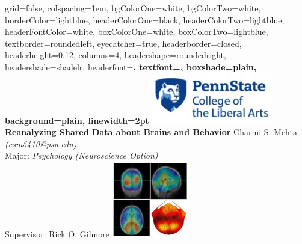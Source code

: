 \documentclass[landscape,final,paperwidth=48in,paperheight=48in,fontscale=0.285]{baposter}
\begin{document}



\begin{poster}%
  {
  grid=false,
  colspacing=1em,
  bgColorOne=white,
  bgColorTwo=white,
  borderColor=lightblue,
  headerColorOne=black,
  headerColorTwo=lightblue,
  headerFontColor=white,
  boxColorOne=white,
  boxColorTwo=lightblue,
  textborder=roundedleft,
  eyecatcher=true,
  headerborder=closed,
  headerheight=0.12\textheight,
  columns=4, %
  headershape=roundedright,
  headershade=shadelr,
  headerfont=\Large\bf\textsc, %
  textfont={\setlength{\parindent}{1.5em}},
  boxshade=plain,
  background=plain,
  linewidth=2pt
  }
  {\includegraphics[height=6em]{img/penn_state_cla_logo_new_210-89.jpg}}
  {\bf{Reanalyzing Shared Data about Brains and Behavior} 
  \vspace{0.5em}}
  {Charmi S. Mehta \emph{(csm5410@psu.edu)}\\ Major: \emph{Psychology (Neuroscience Option)}
  \\ \vspace{0.5em}
  Supervisor: Rick O. Gilmore}
 {\includegraphics[height=9em]{img/fesi-2014.jpg}}


\end{poster}
\end{document}
